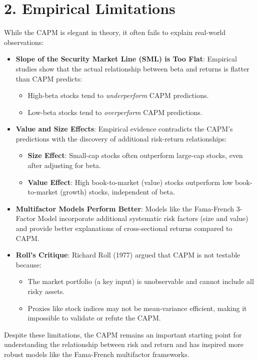 \documentclass[twoside,openany]{book}
\begin{document}
\section*{2. Empirical Limitations}
While the CAPM is elegant in theory, it often fails to explain real-world observations:
\begin{itemize}
    \item \textbf{Slope of the Security Market Line (SML) is Too Flat}:
    Empirical studies show that the actual relationship between beta and returns is flatter than CAPM predicts:
    \begin{itemize}
        \item High-beta stocks tend to \textit{underperform} CAPM predictions.
        \item Low-beta stocks tend to \textit{overperform} CAPM predictions.
    \end{itemize}

    \item \textbf{Value and Size Effects}:
    Empirical evidence contradicts the CAPM's predictions with the discovery of additional risk-return relationships:
    \begin{itemize}
        \item \textbf{Size Effect}: Small-cap stocks often outperform large-cap stocks, even after adjusting for beta.
        \item \textbf{Value Effect}: High book-to-market (value) stocks outperform low book-to-market (growth) stocks, independent of beta.
    \end{itemize}

    \item \textbf{Multifactor Models Perform Better}:
    Models like the Fama-French 3-Factor Model incorporate additional systematic risk factors (size and value) and provide better explanations of cross-sectional returns compared to CAPM.

    \item \textbf{Roll's Critique}:
    Richard Roll (1977) argued that CAPM is not testable because:
    \begin{itemize}
        \item The market portfolio (a key input) is unobservable and cannot include all risky assets.
        \item Proxies like stock indices may not be mean-variance efficient, making it impossible to validate or refute the CAPM.
    \end{itemize}
\end{itemize}

Despite these limitations, the CAPM remains an important starting point for understanding the relationship between risk and return and has inspired more robust models like the Fama-French multifactor frameworks.
\end{document}
